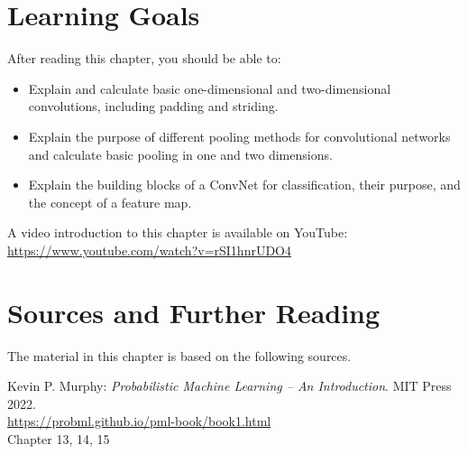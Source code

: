 %
%
\section*{Learning Goals}

After reading this chapter, you should be able to:
\begin{itemize}
   \item Explain and calculate basic one-dimensional and two-dimensional convolutions, including padding and striding.
   \item Explain the purpose of different pooling methods for convolutional networks and calculate basic pooling in one and two dimensions.
   \item Explain the building blocks of a ConvNet for classification, their purpose, and the concept of a feature map.
\end{itemize}

\begin{advanced}
\begin{videobox}
A video introduction to this chapter is available on YouTube:\\

\url{https://www.youtube.com/watch?v=rSI1hnrUDO4}
\end{videobox}
\end{advanced}


\section*{Sources and Further Reading}

The material in this chapter is based on the following sources. 

\begin{resourcebox}
Kevin P. Murphy: \emph{Probabilistic Machine Learning -- An Introduction}. MIT Press 2022. \\

\small\url{https://probml.github.io/pml-book/book1.html}\normalsize \\

Chapter 13, 14, 15
\end{resourcebox}

